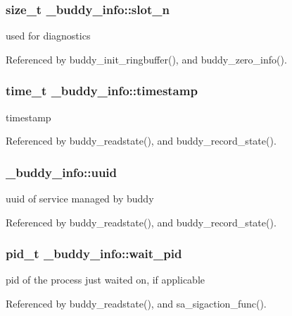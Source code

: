 \subsubsection[{slot\_\-n}]{\setlength{\rightskip}{0pt plus 5cm}size\_\-t {\bf \_\-buddy\_\-info::slot\_\-n}}\label{struct__buddy__info_aea38b50c414cf38d926ffe579e6449db}
used for diagnostics 

Referenced by buddy\_\-init\_\-ringbuffer(), and buddy\_\-zero\_\-info().

\subsubsection[{timestamp}]{\setlength{\rightskip}{0pt plus 5cm}time\_\-t {\bf \_\-buddy\_\-info::timestamp}}\label{struct__buddy__info_ab7990ca27beae47735ee8cbf3376c3d7}
timestamp 

Referenced by buddy\_\-readstate(), and buddy\_\-record\_\-state().

\subsubsection[{uuid}]{ {\bf \_\-buddy\_\-info::uuid}}\label{struct__buddy__info_a677c1a945cf4e2571cdd29b7ae822439}
uuid of service managed by buddy 

Referenced by buddy\_\-readstate(), and buddy\_\-record\_\-state().

\subsubsection[{wait\_\-pid}]{\setlength{\rightskip}{0pt plus 5cm}pid\_\-t {\bf \_\-buddy\_\-info::wait\_\-pid}}\label{struct__buddy__info_af7057b15fc51781ce0bb63d717d59e2a}
pid of the process just waited on, if applicable 

Referenced by buddy\_\-readstate(), and sa\_\-sigaction\_\-func().

